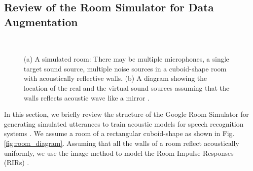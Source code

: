 \documentclass{article}
\begin{document}
\subsection{Review of the Room Simulator for Data Augmentation}
%
%
\begin{figure}
  \begin{center}
   \\
   \caption{
    (a) A simulated room: There may be multiple microphones, a single target
    sound source, multiple noise sources in a cuboid-shape room with
    acoustically reflective walls. (b) A diagram showing the location
    of the real and the virtual sound sources assuming that the walls
    reflects acoustic wave like a mirror \cite{C_Kim_INTERSPEECH_2017_1}.}
  \end{center}
  \vspace{-10mm}
\end{figure}
%
%
In this section, we briefly review the structure of the Google
Room Simulator for generating simulated utterances
to train acoustic models for speech recognition systems
\cite{C_Kim_INTERSPEECH_2017_1}. We assume a room of a
rectangular cuboid-shape as shown in Fig. \ref{fig:room_diagram}.
Assuming that all the walls of a room reflect acoustically uniformly,
we use the image method to model the Room Impulse Responses (RIRs)
\cite{J_Allen_JASA_1979, E_A_Lehmann_ASPAA_2007, S_G_McGovern_RIR}.
\end{document}
